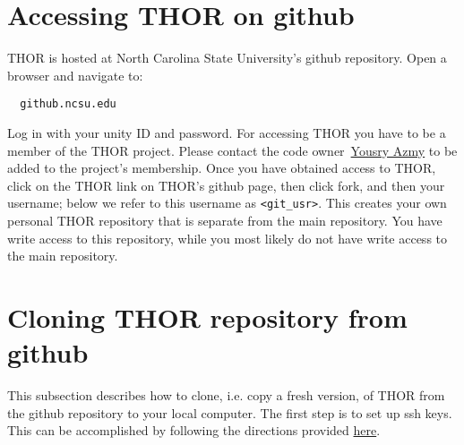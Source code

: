 \section{Accessing THOR on github}
THOR is hosted at North Carolina State University's github repository. Open a browser and navigate to:
\begin{verbatim}
  github.ncsu.edu    
\end{verbatim}
Log in with your unity ID and password. For accessing THOR you have to be a member of the THOR project. Please contact the code owner~\href{mailto:yyazmy@ncsu.edu}{Yousry Azmy} to be added to the project's membership.
Once you have obtained access to THOR, click on the THOR link on THOR's github page, then click fork, and then your username; below we refer to this username as 
\verb"<git_usr>".
This creates your own personal THOR repository that is separate from the main repository. You have write access to this repository, while you most likely do not have write access to the main repository.

\section{Cloning THOR repository from github}
This subsection describes how to clone, i.e. copy a fresh version, of THOR from the github repository to your local computer. The first step is to set up ssh keys. This can be accomplished by following the directions provided \href{https://help.github.com/en/enterprise/2.15/user/articles/adding-a-new-ssh-key-to-your-github-account}{here}. 

